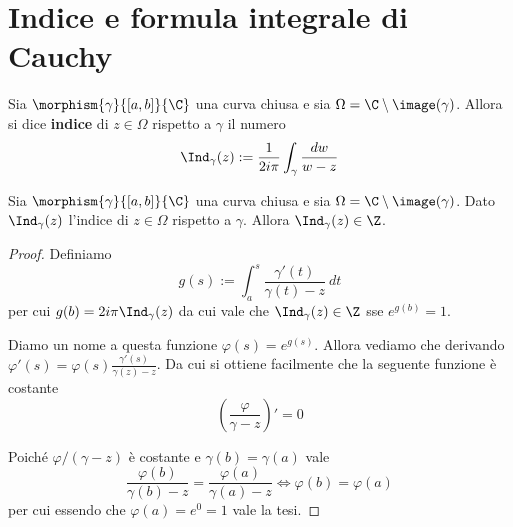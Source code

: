 \chapter{Indice e formula integrale di Cauchy}

\begin{definition}
  \label{def:indice-in-z}
  Sia $\morphism{\gamma}{\left[ a,b \right]}{\C}$ una curva chiusa e sia
  $\Omega = \C \setminus \image(\gamma)$. Allora si dice \textbf{indice} di
  $z \in \Omega$ rispetto a $\gamma$ il numero 
  \begin{equation*}
    \Ind_\gamma(z) := \frac{1}{2i\pi} \int_\gamma
    \frac{dw}{w-z}
  \end{equation*}
\end{definition}

\begin{lemma}
  Sia $\morphism{\gamma}{\left[ a,b \right]}{\C}$ una curva chiusa e sia
  $\Omega = \C \setminus \image(\gamma)$. Dato $\Ind_\gamma(z)$
  l'indice di $z \in \Omega$ rispetto a $\gamma$. Allora
  $\Ind_\gamma(z) \in \Z$.
  \label{lem:index-is-natural-number}
\end{lemma}
\begin{proof}
  Definiamo 
  \begin{equation*}
    g(s) := \int^{s}_{a} \frac{\gamma'(t)}{\gamma(t) - z} \ dt
  \end{equation*}
  per cui $g(b) = 2i\pi\Ind_\gamma(z)$ da cui vale che
  $\Ind_\gamma(z) \in \Z$ sse $e^{g(b)} = 1$. 
  
  Diamo un nome a questa funzione $\varphi(s) = e^{g(s)}$. Allora vediamo
  che derivando $\varphi'(s) = \varphi(s) \frac{\gamma'(s)}{\gamma(z) - z}$.
  Da cui si ottiene facilmente che la seguente funzione è costante
  \begin{equation*}
    \left(\frac{\varphi}{\gamma - z}\right)' = 0
  \end{equation*}

  Poiché $\varphi/(\gamma - z)$ è costante e $\gamma(b) = \gamma(a)$ vale 
  \begin{equation*}
    \frac{\varphi(b)}{\gamma(b) - z} = \frac{\varphi(a)}{\gamma(a) - z}
    \Longleftrightarrow \varphi(b) = \varphi(a)
  \end{equation*}
  per cui essendo che $\varphi(a) = e^0 = 1$ vale la tesi.
\end{proof}

